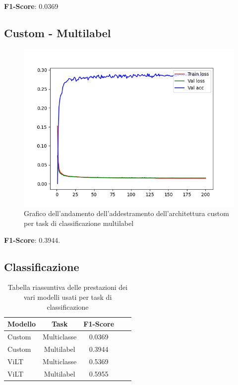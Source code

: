 \documentclass[../main.tex]{subfiles}
\begin{document}
\textbf{F1-Score}: 0.0369

\subsection{Custom - Multilabel}

\begin{figure}[H]
    \centering
    \includegraphics[width=1\linewidth]{static//custom-multilabel/run.png}
    \caption{Grafico dell'andamento dell'addestramento dell'architettura custom per task di classificazione multilabel}
    \label{fig:enter-label}
\end{figure}

\textbf{F1-Score}: 0.3944. 

\subsection{Classificazione}

\begin{table}[H]
    \centering
    \begin{tabular}{|l|c|c|c|c|}
    \hline
    \textbf{Modello} &
    \textbf{Task} &
    \textbf{F1-Score} \\ \hline
    Custom & Multiclasse & 0.0369 \\ \hline
    Custom & Multilabel & 0.3944 \\ \hline
    ViLT & Multiclasse & 0.5369 \\ \hline
    ViLT & Multilabel & 0.5955 \\ \hline
    \end{tabular}
    \caption{Tabella riassuntiva delle prestazioni dei vari modelli usati per task di classificazione}
    \label{tab:recap-classify}
\end{table}
\end{document}
